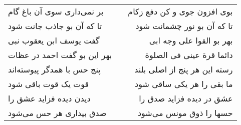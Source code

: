 \begin{center}
\begin{longtable}{l p{0.5cm} r}
بر نمی‌داری سوی آن باغ گام
&&
بوی افزون جوی و کن دفع زکام
\\
تا که آن بو جاذب جانت شود
&&
تا که آن بو نور چشمانت شود
\\
گفت یوسف ابن یعقوب نبی
&&
بهر بو القوا علی وجه ابی
\\
بهر این بو گفت احمد در عظات
&&
دائما قرة عینی فی الصلوة
\\
پنج حس با همدگر پیوسته‌اند
&&
رسته این هر پنج از اصلی بلند
\\
قوت یک قوت باقی شود
&&
ما بقی را هر یکی ساقی شود
\\
دیدن دیده فزاید عشق را
&&
عشق در دیده فزاید صدق را
\\
صدق بیداری هر حس می‌شود
&&
حسها را ذوق مونس می‌شود
\\
\end{longtable}
\end{center}
